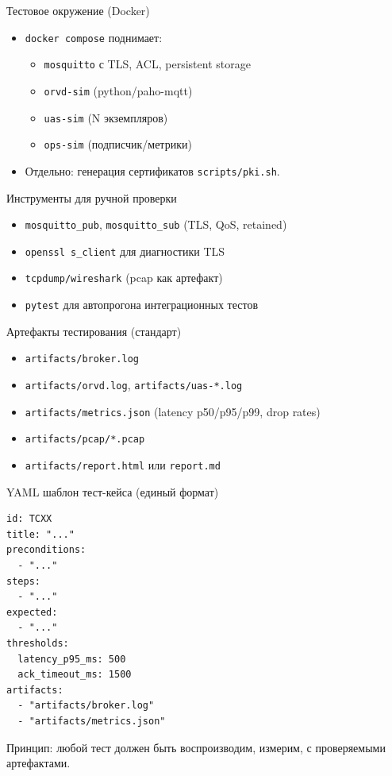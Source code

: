 \documentclass[aspectratio=169]{beamer}
\begin{document}
\begin{frame}{Тестовое окружение (Docker)}
\begin{itemize}
  \item \texttt{docker compose} поднимает:
  \begin{itemize}
    \item \texttt{mosquitto} с TLS, ACL, persistent storage
    \item \texttt{orvd-sim} (python/paho-mqtt)
    \item \texttt{uas-sim} (N экземпляров)
    \item \texttt{ops-sim} (подписчик/метрики)
  \end{itemize}
  \item Отдельно: генерация сертификатов \texttt{scripts/pki.sh}.
\end{itemize}
\end{frame}

\begin{frame}{Инструменты для ручной проверки}
\begin{itemize}
  \item \texttt{mosquitto\_pub}, \texttt{mosquitto\_sub} (TLS, QoS, retained)
  \item \texttt{openssl s\_client} для диагностики TLS
  \item \texttt{tcpdump/wireshark} (pcap как артефакт)
  \item \texttt{pytest} для автопрогона интеграционных тестов
\end{itemize}
\end{frame}

\begin{frame}{Артефакты тестирования (стандарт)}
\begin{itemize}
  \item \texttt{artifacts/broker.log}
  \item \texttt{artifacts/orvd.log}, \texttt{artifacts/uas-*.log}
  \item \texttt{artifacts/metrics.json} (latency p50/p95/p99, drop rates)
  \item \texttt{artifacts/pcap/*.pcap}
  \item \texttt{artifacts/report.html} или \texttt{report.md}
\end{itemize}
\end{frame}

\begin{frame}{YAML шаблон тест-кейса (единый формат)}
\small
\begin{verbatim}
id: TCXX
title: "..."
preconditions:
  - "..."
steps:
  - "..."
expected:
  - "..."
thresholds:
  latency_p95_ms: 500
  ack_timeout_ms: 1500
artifacts:
  - "artifacts/broker.log"
  - "artifacts/metrics.json"
\end{verbatim}
Принцип: любой тест должен быть воспроизводим, измерим, с проверяемыми артефактами.
\end{frame}
\end{document}
